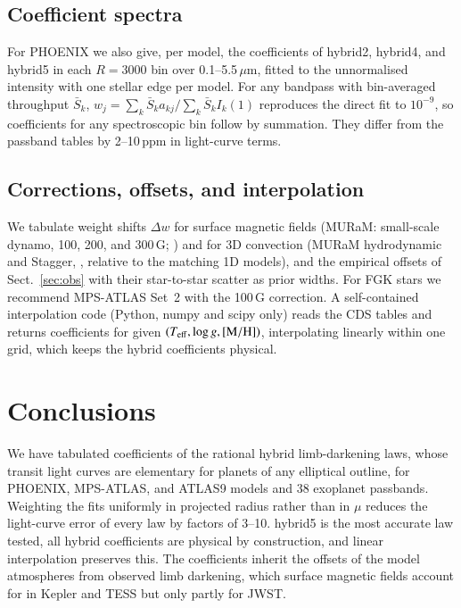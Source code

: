 \documentclass{aa}
\newcommand{\ppm}{\,\textrm{ppm}}
\newcommand{\teff}{T_{\rm eff}}
\begin{document}
\subsection{Coefficient spectra}\label{sec:spectra}
For PHOENIX we also give, per model, the coefficients of hybrid2, hybrid4, and
hybrid5 in each $R=3000$ bin over 0.1--5.5\,$\mu$m, fitted to the unnormalised
intensity with one stellar edge per model. For any bandpass with bin-averaged
throughput $\bar S_k$, $w_j=\sum_k\bar S_k a_{kj}/\sum_k\bar S_k I_k(1)$
reproduces the direct fit to $10^{-9}$, so coefficients for any spectroscopic
bin follow by summation. They differ from the passband tables by 2--10\ppm{} in
light-curve terms.

\subsection{Corrections, offsets, and interpolation}
We tabulate weight shifts $\Delta w$ for surface magnetic fields (MURaM:
small-scale dynamo, 100, 200, and 300\,G; \citealt{kostogryz2026}) and for 3D
convection (MURaM hydrodynamic and Stagger, \citealt{magic2015}, relative to the
matching 1D models), and the empirical offsets of Sect.~\ref{sec:obs} with their
star-to-star scatter as prior widths. For FGK stars we recommend MPS-ATLAS Set~2
with the 100\,G correction. A self-contained interpolation code (Python, numpy
and scipy only) reads the CDS tables and returns coefficients for given
$(\teff,\log g,[{\rm M/H}])$, interpolating linearly within one grid, which
keeps the hybrid coefficients physical.

\section{Conclusions}
We have tabulated coefficients of the rational hybrid limb-darkening laws,
whose transit light curves are elementary for planets of any elliptical outline,
for PHOENIX, MPS-ATLAS, and ATLAS9 models and 38 exoplanet passbands. Weighting
the fits uniformly in projected radius rather than in $\mu$ reduces the
light-curve error of every law by factors of 3--10. hybrid5 is the most accurate
law tested, all hybrid coefficients are physical by construction, and linear
interpolation preserves this. The coefficients inherit the offsets of the model
atmospheres from observed limb darkening, which surface magnetic fields account
for in Kepler and TESS but only partly for JWST.
\end{document}
